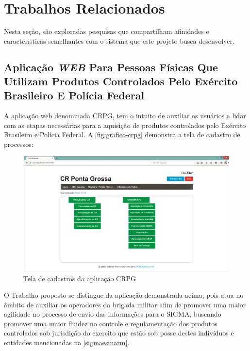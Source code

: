 \chapter{Trabalhos Relacionados}
Nesta seção, são exploradas pesquisas que compartilham afinidades e características semelhantes com o sistema que este projeto busca desenvolver.
   
\section{Aplicação \textit{WEB} Para Pessoas Físicas Que Utilizam Produtos Controlados Pelo Exército
Brasileiro E Polícia Federal}
A aplicação web denominada CRPG, tem o intuito de auxiliar os usuários a lidar com as etapas necessárias para a aquisição de produtos controlados pelo Exército Brasileiro e Polícia Federal. A \autoref{fig:grafico-crpg} demonstra a tela de cadastro de processos: 

\begin{figure}[htb]
    \caption{\label{fig:grafico-crpg}Tela de cadastros da aplicação CRPG}
    \begin{center}
        \includegraphics[scale=0.9]{imagens/crpg.png}
    \end{center}
\end{figure}

O Trabalho proposto se distingue da aplicação demonstrada acima, pois atua no âmbito de auxiliar os operadores da brigada militar afim de promover uma maior agilidade no processo de envio das informações para o SIGMA, buscando promover uma maior fluidez no controle e regulamentação dos produtos controlados sob jurisdição do exercito que estão sob posse destes indivíduos e entidades mencionadas na \autoref{sigmaesinarm}.



